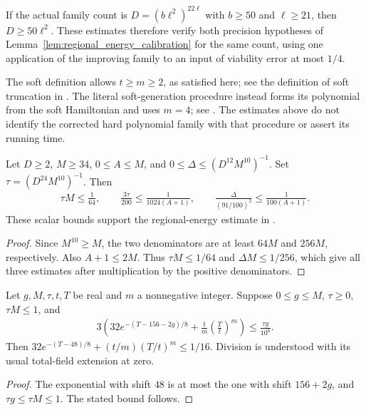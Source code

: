 If the actual family count is $D=(b\ell^2)^{22\ell}$ with $b\ge50$
and $\ell\ge21$, then $D\ge50\ell^2$. These estimates therefore verify
both precision hypotheses of Lemma~\ref{lem:regional_energy_calibration}
for the same count, using one application of the improving family to
an input of viability error at most $1/4$.

The soft definition allows $t\ge m\ge2$, as satisfied here;
see the definition of soft truncation in \cite[lines 1178--1185]
{Arad2016RigorousRG}. The literal soft-generation procedure instead
forms its polynomial from the soft Hamiltonian and uses $m=4$;
see \cite[Figure \texttt{fig:generate} and lines 1377--1404]
{Arad2016RigorousRG}. The estimates above do not identify the corrected
hard polynomial family with that procedure or assert its running time.

\begin{theorem}
    \label{thm:soft_terminal_energy_precision}
    \leanok
    Let $D\ge2$, $M\ge34$, $0\le A\le M$, and
    $0\le\Delta\le(D^{12}M^{10})^{-1}$. Set
    $\tau=(D^{24}M^{10})^{-1}$. Then
    \begin{align}
        \tau M\le\frac1{64},\qquad
        \frac{3\tau}{200}\le\frac1{1024(A+1)},\qquad
        \frac{\Delta}{(91/100)^2}\le\frac1{100(A+1)}.
    \end{align}
    These scalar bounds support the regional-energy estimate in
    \cite[line 1807]{Arad2016RigorousRG}.
\end{theorem}
\begin{proof}\leanok
    Since $M^{10}\ge M$, the two denominators are at least $64M$
    and $256M$, respectively. Also $A+1\le2M$. Thus
    $\tau M\le1/64$ and $\Delta M\le1/256$, which give all three
    estimates after multiplication by the positive denominators.
\end{proof}

\begin{theorem}
    \label{thm:soft_terminal_regional_residual}
    \leanok
    Let $g,M,\tau,t,T$ be real and $m$ a nonnegative integer.
    Suppose $0\le g\le M$, $\tau\ge0$, $\tau M\le1$, and
    \begin{align}
        3\left(32e^{-(T-156-2g)/8}
        +\frac tm\left(\frac Tt\right)^m\right)
        \le\frac{\tau g}{10^6}.
    \end{align}
    Then $32e^{-(T-48)/8}+(t/m)(T/t)^m\le1/16$.
    Division is understood with its usual total-field extension at zero.
\end{theorem}
\begin{proof}\leanok
    The exponential with shift $48$ is at most the one with shift
    $156+2g$, and $\tau g\le\tau M\le1$. The stated bound follows.
\end{proof}

